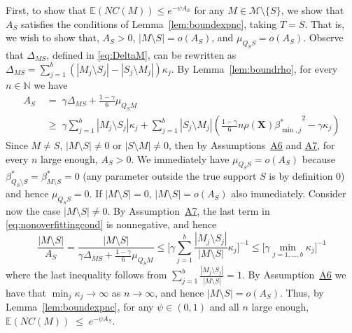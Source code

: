 \documentclass[bj,authoryear]{imsart}
\theoremstyle{plain}
\newcommand{\E}{\mathbb{E}}
\newcommand{\N}{\mathbb{N}}
\newcommand{\bs}{\boldsymbol}
\begin{document}
First, to show that $\E(NC(M)) \leq e^{-\psi A_S}$
for any $M\in\mathcal{M}\setminus \{S\}$, we show that $A_S$ satisfies the conditions of Lemma~\ref{lem:boundexpnc}, taking $T=S$. 
That is, we wish to show that, $A_S>0$, $|M\setminus S|=o(A_S)$, and $\mu_{Q_S S}=o(A_S)$. 
Observe that $\Delta_{MS}$, defined in \eqref{eq:DeltaM}, can be rewritten as $\Delta_{MS}=\sum_{j=1}^b(|M_j\setminus S_j|-|S_j\setminus M_j|)\kappa_j$. By  Lemma~\ref{lem:boundrho}, for every $n\in \N$ we have 
\begin{equation}\label{eq:nonoverfittingcond}
\begin{aligned}
     A_S & \;=\; \gamma \Delta_{MS}+\frac{1-\gamma}{6}\mu_{Q_SM}\\
     & \;\geq\;  \gamma\sum_{j=1}^b|M_j \setminus S_j|\kappa_j + \sum_{j=1}^b |S_j\setminus M_j |\left(\tfrac{1-\gamma}{6} n \rho(\bs X) {\beta^*_{\min,j}}^{2} - \gamma\kappa_j\right) 
\end{aligned}
\end{equation} 
Since $M\neq S$, $|M\setminus S|\neq0$ or $|S\setminus M|\neq0$, then by Assumptions~\hyperlink{lab:A6}{A6} and \hyperlink{lab:A7}{A7}, for every $n$ large enough, $A_S>0$. We immediately have $\mu_{Q_S S}=o(A_S)$ because $\beta^*_{Q_S\setminus S}=\beta^*_{M\setminus S}=0$ (any parameter outside the true support $S$ is by definition 0) and hence $\mu_{Q_S S}=0$.
If $|M\setminus S|=0$, $|M\setminus S|=o(A_S)$ also immediately. Consider now the case $|M\setminus S|\neq 0$. By Assumption~\hyperlink{lab:A7}{A7}, the last term in \eqref{eq:nonoverfittingcond} is nonnegative, and hence
$$\frac{|M\setminus S|}{A_S}
= \frac{|M\setminus S|}{\gamma \Delta_{MS}+\frac{1-\gamma}{6}\mu_{Q_SM}}
\leq \bigg[ \gamma\sum_{j=1}^b\frac{|M_j \setminus S_j|}{|M\setminus S|}\kappa_j \bigg]^{-1} \leq \Big[ \gamma\min_{j=1,\ldots,b}\kappa_j \Big]^{-1} $$
where the last inequality follows from $\sum_{j=1}^b\frac{|M_j \setminus S_j|}{|M\setminus S|}=1$. By Assumption~\hyperlink{lab:A6}{A6} we have that $\min_j \kappa_j \to \infty$ as $n \rightarrow \infty$, and hence $|M\setminus S|=o(A_S)$. Thus, %
by Lemma~\ref{lem:boundexpnc}, for any $\psi\in(0,1)$ and all $n$ large enough,
$
\E(NC(M))\;\leq\;e^{-\psi A_S}.
$
\end{document}
